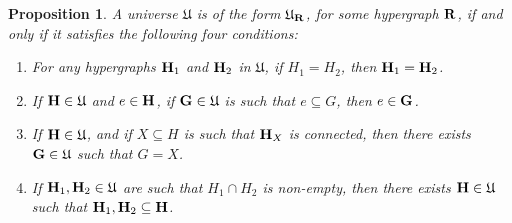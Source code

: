 \documentclass[11pt]{article}
\newtheorem{proposition}[theo]{Proposition}
\theoremstyle{definition}
\numberwithin{equation}{section}
\numberwithin{equation}{section}
\newcommand{\inc}{\subseteq}
\newcommand{\hyper}[1]{{\bf #1}}
\begin{document}
\begin{proposition}  \label{restrictohedra-characterisation}
A universe $\mathfrak{U}$ is of the form $\mathfrak{U}_{\hyper{R}}$, for some hypergraph $\hyper{R}$, if and only if it satisfies the  following four conditions:

\begin{enumerate}
\item
For any hypergraphs $\hyper{H}_1$ and $\hyper{H}_2$ in $\mathfrak{U}$, if $H_1=H_2$, then $\hyper{H}_1=\hyper{H}_2$.
\item  
If $\hyper{H}\in\mathfrak{U}$ and $e\in\hyper{H}$, if  $\hyper{G}\in\mathfrak{U}$ is such that $e\inc G$, then $e\in\hyper{G}$.

\item
If  $\hyper{H}\in\mathfrak{U}$, and if  $X \inc H$ is such that $\hyper{H}_X$ is connected, then there exists $\hyper{G}\in \mathfrak{U}$ such that $G=X$.

\item
If $\hyper{H}_1,\hyper{H}_2\in \mathfrak{U}$ are such that $H_1 \cap H_2$ is non-empty, then there exists $\hyper{H}\in \mathfrak{U}$  such that  $\hyper{H}_1,\hyper{H}_2\inc\hyper{H}$. 
\end{enumerate}
\end{proposition}
\end{document}
